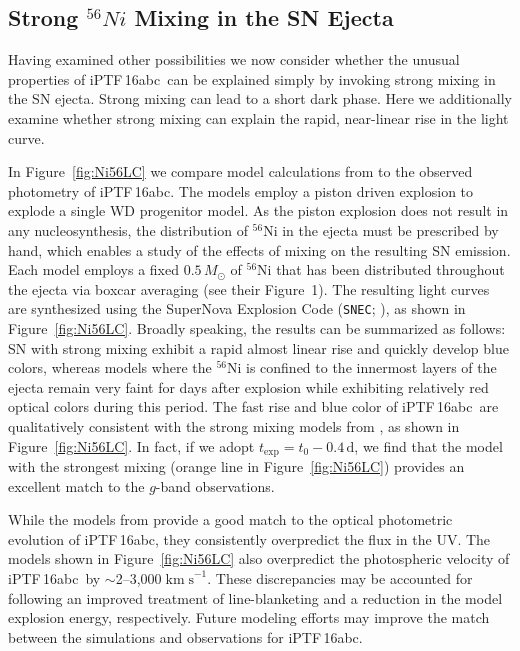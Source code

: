 \documentclass[twocolumn]{aastex61}
\newcommand{\sm}{M_\odot}
\newcommand{\abc}{iPTF\,16abc}
\begin{document}
\subsection{Strong $^{56}Ni$ Mixing in the SN Ejecta}
\label{sec:Ni_mixing}

Having examined other possibilities we now consider whether the unusual properties of \abc\ can be explained simply by invoking strong mixing in the SN ejecta. Strong mixing can lead to a short dark phase. Here we additionally examine whether strong mixing can explain the rapid, near-linear rise in the light curve.

In Figure~\ref{fig:Ni56LC} we compare model calculations from \citet{2016ApJ...826...96P} to the observed photometry of \abc. The \citeauthor{2016ApJ...826...96P} models employ a piston driven explosion to explode a single WD progenitor model. As the piston explosion does not result in any nucleosynthesis, the distribution of $^{56}$Ni in the ejecta must be prescribed by hand, which enables a study of the effects of mixing on the resulting SN emission. Each model employs a fixed $0.5\,\sm$ of $^{56}$Ni that has been distributed throughout the ejecta via boxcar averaging (see their Figure~1). The resulting light curves are synthesized using the SuperNova Explosion Code (\texttt{SNEC}; \citealt{2015ApJ...814...63M}), as shown in Figure~\ref{fig:Ni56LC}. Broadly speaking, the results can be summarized as follows: SN with strong mixing exhibit a rapid almost linear rise and quickly develop blue colors, whereas models where the $^{56}$Ni is confined to the innermost layers of the ejecta remain very faint for days after explosion while exhibiting relatively red optical colors during this period. The fast rise and blue color of \abc\ are qualitatively consistent with the strong mixing models from \citet{2016ApJ...826...96P}, as shown in Figure~\ref{fig:Ni56LC}. In fact, if we adopt $t_\mathrm{exp} = t_0 - 0.4 \, \mathrm{d}$, we find that the model with the strongest mixing (orange line in Figure~\ref{fig:Ni56LC}) provides an excellent match to the $g$-band observations.

While the models from \citet{2016ApJ...826...96P} provide a good match to the optical photometric evolution of \abc, they consistently overpredict the flux in the UV. The models shown in Figure~\ref{fig:Ni56LC} also overpredict the photospheric velocity of \abc\ by $\sim$2--3,000$\; \mathrm{km \; s}^{-1}$. These discrepancies may be accounted for following an improved treatment of line-blanketing and a reduction in the model explosion energy, respectively. Future modeling efforts may improve the match between the simulations and observations for \abc.
\end{document}
